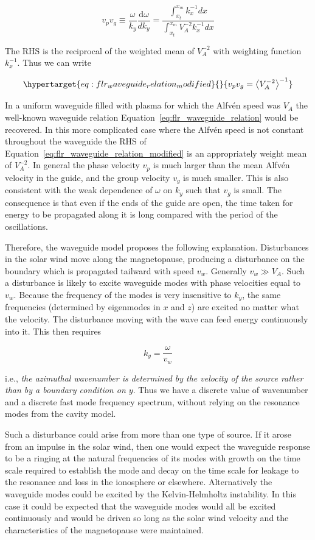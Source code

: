 \documentclass[
  notoc %
]{tufte-book}
\begin{document}
\[
v_p v_g \equiv \frac{\omega}{k_y}\frac{\mathrm{d}\omega}{dk_y} = \frac{\int_{x_t}^{x_m}k_x^{-1}dx}{\int_{x_t}^{x_m}V_A^{-2}k_x^{-1}dx}
\]

The RHS is the reciprocal of the weighted mean of \(V_A^{-2}\) with
weighting function \(k_x^{-1}\). Thus we can write

\begin{equation}\protect\hypertarget{eq:flr_waveguide_relation_modified}{}{
v_p v_g = \left<V_A^{-2}\right>^{-1}
}\label{eq:flr_waveguide_relation_modified}\end{equation}

In a uniform waveguide filled with plasma for which the Alfvén speed was
\(V_A\) the well-known waveguide relation
Equation~\ref{eq:flr_waveguide_relation} would be recovered. In this
more complicated case where the Alfvén speed is not constant throughout
the waveguide the RHS of
Equation~\ref{eq:flr_waveguide_relation_modified} is an appropriately
weight mean of \(V_A^{-2}\). In general the phase velocity \(v_p\) is
much larger than the mean Alfvén velocity in the guide, and the group
velocity \(v_g\) is much smaller. This is also consistent with the weak
dependence of \(\omega\) on \(k_y\) such that \(v_g\) is small. The
consequence is that even if the ends of the guide are open, the time
taken for energy to be propagated along it is long compared with the
period of the oscillations.

Therefore, the waveguide model proposes the following explanation.
Disturbances in the solar wind move along the magnetopause, producing a
disturbance on the boundary which is propagated tailward with speed
\(v_w\). Generally \(v_w \gg V_A\). Such a disturbance is likely to
excite waveguide modes with phase velocities equal to \(v_w\). Because
the frequency of the modes is very insensitive to \(k_y\), the same
frequencies (determined by eigenmodes in \(x\) and \(z\)) are excited no
matter what the velocity. The disturbance moving with the wave can feed
energy continuously into it. This then requires

\[
k_y = \frac{\omega}{v_w}
\]

i.e., \emph{the azimuthal wavenumber is determined by the velocity of
the source rather than by a boundary condition on \(y\)}. Thus we have a
discrete value of wavenumber and a discrete fast mode frequency
spectrum, without relying on the resonance modes from the cavity model.

Such a disturbance could arise from more than one type of source. If it
arose from an impulse in the solar wind, then one would expect the
waveguide response to be a ringing at the natural frequencies of its
modes with growth on the time scale required to establish the mode and
decay on the time scale for leakage to the resonance and loss in the
ionosphere or elsewhere. Alternatively the waveguide modes could be
excited by the Kelvin-Helmholtz instability. In this case it could be
expected that the waveguide modes would all be excited continuously and
would be driven so long as the solar wind velocity and the
characteristics of the magnetopause were maintained.
\end{document}
